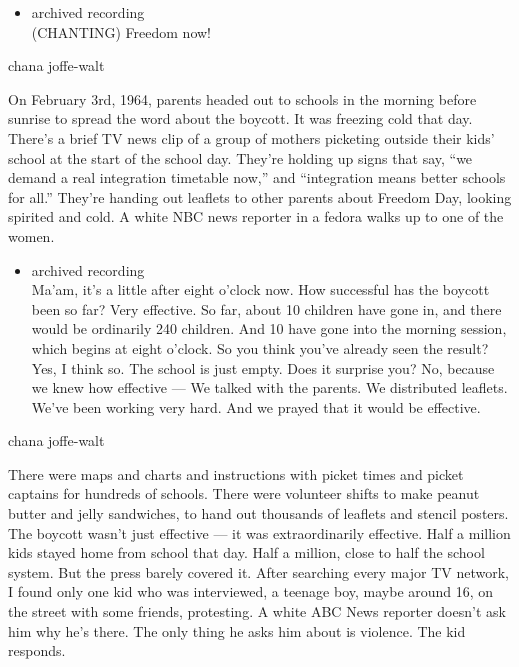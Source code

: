 \begin{itemize}
\tightlist
\item
  archived recording\\
  (CHANTING) Freedom now!
\end{itemize}

chana joffe-walt

On February 3rd, 1964, parents headed out to schools in the morning
before sunrise to spread the word about the boycott. It was freezing
cold that day. There's a brief TV news clip of a group of mothers
picketing outside their kids' school at the start of the school day.
They're holding up signs that say, ``we demand a real integration
timetable now,'' and ``integration means better schools for all.''
They're handing out leaflets to other parents about Freedom Day, looking
spirited and cold. A white NBC news reporter in a fedora walks up to one
of the women.

\begin{itemize}
\tightlist
\item
  archived recording\\
  Ma'am, it's a little after eight o'clock now. How successful has the
  boycott been so far? Very effective. So far, about 10 children have
  gone in, and there would be ordinarily 240 children. And 10 have gone
  into the morning session, which begins at eight o'clock. So you think
  you've already seen the result? Yes, I think so. The school is just
  empty. Does it surprise you? No, because we knew how effective --- We
  talked with the parents. We distributed leaflets. We've been working
  very hard. And we prayed that it would be effective.
\end{itemize}

chana joffe-walt

There were maps and charts and instructions with picket times and picket
captains for hundreds of schools. There were volunteer shifts to make
peanut butter and jelly sandwiches, to hand out thousands of leaflets
and stencil posters. The boycott wasn't just effective --- it was
extraordinarily effective. Half a million kids stayed home from school
that day. Half a million, close to half the school system. But the press
barely covered it. After searching every major TV network, I found only
one kid who was interviewed, a teenage boy, maybe around 16, on the
street with some friends, protesting. A white ABC News reporter doesn't
ask him why he's there. The only thing he asks him about is violence.
The kid responds.

